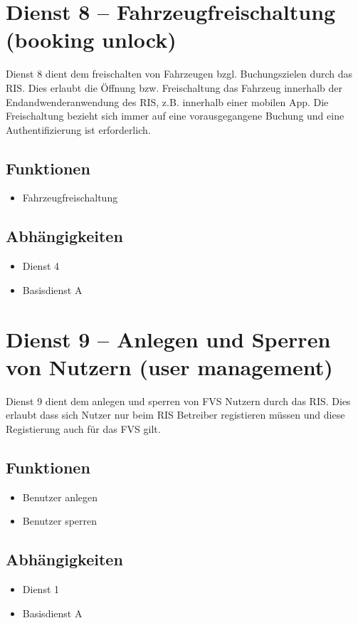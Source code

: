 \section{Dienst 8 -- Fahrzeugfreischaltung (booking unlock)}
Dienst 8 dient dem freischalten von Fahrzeugen bzgl. Buchungszielen durch das RIS. Dies erlaubt die Öffnung bzw. Freischaltung das Fahrzeug innerhalb der Endandwenderanwendung des RIS, z.B. innerhalb einer mobilen App. Die Freischaltung bezieht sich immer auf eine vorausgegangene Buchung und eine Authentifizierung ist erforderlich.

\subsection*{Funktionen}
\begin{itemize}
\item Fahrzeugfreischaltung
\end{itemize}

\subsection*{Abhängigkeiten}
\begin{itemize}
\item Dienst 4
\item Basisdienst A
\end{itemize}

\section{Dienst 9 -- Anlegen und Sperren von Nutzern (user management)}
Dienst 9 dient dem anlegen und sperren von FVS Nutzern durch das RIS. Dies erlaubt dass sich Nutzer nur beim RIS Betreiber registieren müssen und diese Registierung auch für das FVS gilt.

\subsection*{Funktionen}
\begin{itemize}
\item Benutzer anlegen
\item Benutzer sperren
\end{itemize}

\subsection*{Abhängigkeiten}
\begin{itemize}
\item Dienst 1
\item Basisdienst A
\end{itemize}
